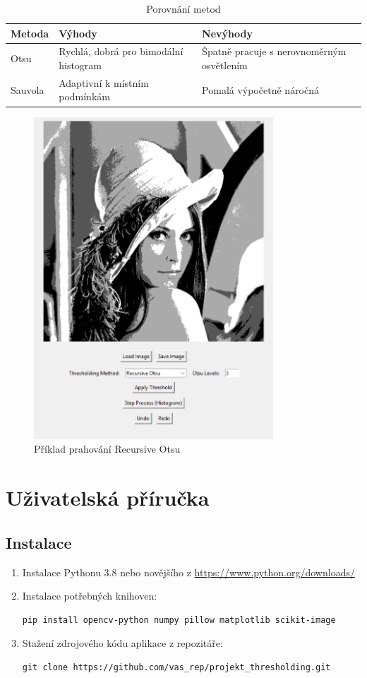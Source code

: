 \documentclass[12pt,a4paper]{article}
\begin{document}
\begin{table}[h]
\centering
\caption{Porovnání metod}
\begin{tabular}{|l|l|l|}
\hline
Metoda & Výhody & Nevýhody \\
\hline
Otsu & Rychlá, dobrá pro bimodální histogram & Špatně pracuje s nerovnoměrným osvětlením \\
Sauvola & Adaptivní k místním podmínkám & Pomalá výpočetně náročná \\
\hline
\end{tabular}
\end{table}
\newpage
\begin{figure}[h]
\centering
\includegraphics[width=0.8\textwidth]{otsu.png}
\caption{Příklad prahování Recursive Otsu}
\label{fig:vysledky}
\end{figure}


\section{Uživatelská příručka}

\subsection{Instalace}
\begin{enumerate}
\item Instalace Pythonu 3.8 nebo novějšího z \url{https://www.python.org/downloads/}
\item Instalace potřebných knihoven:
\begin{verbatim}
pip install opencv-python numpy pillow matplotlib scikit-image
\end{verbatim}
\item Stažení zdrojového kódu aplikace z repozitáře:
\begin{verbatim}
git clone https://github.com/vas_rep/projekt_thresholding.git
\end{verbatim}
\end{enumerate}
\end{document}
